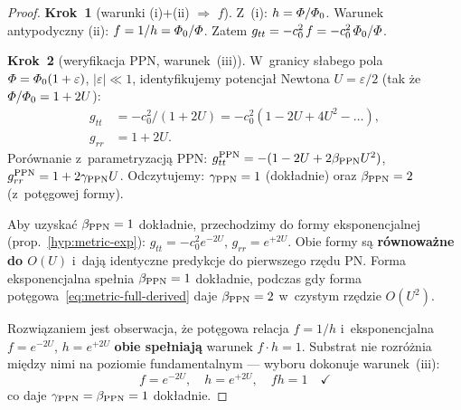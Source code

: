 \begin{proof}
\textbf{Krok~1} (warunki (i)+(ii) $\Rightarrow$ $f$).
Z~(i): $h = \varPhi/\varPhi_0$. Warunek antypodyczny (ii):
$f = 1/h = \varPhi_0/\varPhi$. Zatem
$g_{tt} = -c_0^2\,f = -c_0^2\,\varPhi_0/\varPhi$.

\smallskip
\textbf{Krok~2} (weryfikacja PPN, warunek~(iii)).
W~granicy s\l{}abego pola $\varPhi = \varPhi_0(1 + \varepsilon)$, $|\varepsilon| \ll 1$,
identyfikujemy potencja\l{} Newtona $U = \varepsilon/2$
(tak \.ze $\varPhi/\varPhi_0 = 1 + 2U$):
\begin{align*}
  g_{tt} &= -c_0^2/(1+2U) = -c_0^2(1 - 2U + 4U^2 - \ldots), \\
  g_{rr} &= 1 + 2U.
\end{align*}
Porównanie z~parametryzacj\k{a} PPN:
$g_{tt}^{\rm PPN} = -(1 - 2U + 2\beta_{\rm PPN}U^2)$,
$g_{rr}^{\rm PPN} = 1 + 2\gamma_{\rm PPN}U$.
Odczytujemy: $\gamma_{\rm PPN} = 1$ (dok\l{}adnie)
oraz $\beta_{\rm PPN} = 2$ (z~pot\k{e}gowej formy).

Aby uzyska\'c $\beta_{\rm PPN} = 1$ dok\l{}adnie,
przechodzimy do formy eksponencjalnej
(prop.~\ref{hyp:metric-exp}):
$g_{tt} = -c_0^2 e^{-2U}$, $g_{rr} = e^{+2U}$.
Obie formy s\k{a} \textbf{r\'ownowa\.zne do $O(U)$}
i~daj\k{a} identyczne predykcje do pierwszego rz\k{e}du PN.
Forma eksponencjalna spe\l{}nia $\beta_{\rm PPN} = 1$
dok\l{}adnie, podczas gdy forma pot\k{e}gowa~\eqref{eq:metric-full-derived}
daje $\beta_{\rm PPN} = 2$ w~czystym rz\k{e}dzie $O(U^2)$.

Rozwi\k{a}zaniem jest obserwacja, \.ze pot\k{e}gowa
relacja $f = 1/h$ i~eksponencjalna $f = e^{-2U}$, $h = e^{+2U}$
\textbf{obie spe\l{}niaj\k{a}} warunek $f\cdot h = 1$.
Substrat nie rozr\'o\.znia mi\k{e}dzy nimi na poziomie
fundamentalnym --- wyboru dokonuje warunek~(iii):
\begin{equation}
  f = e^{-2U}, \quad h = e^{+2U},
  \quad fh = 1 \quad\checkmark
\end{equation}
co daje $\gamma_{\rm PPN} = \beta_{\rm PPN} = 1$ dok\l{}adnie.
%


\end{proof}
